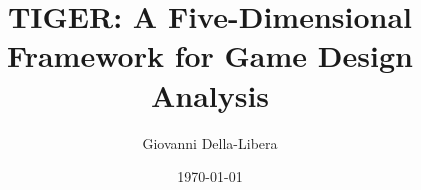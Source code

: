 \documentclass{article}
\title{TIGER: A Five-Dimensional Framework for Game Design Analysis}
\author{Giovanni Della-Libera}
\date{\today}
\begin{document}
\maketitle

\begin{abstract}

\end{abstract}










\end{document}
